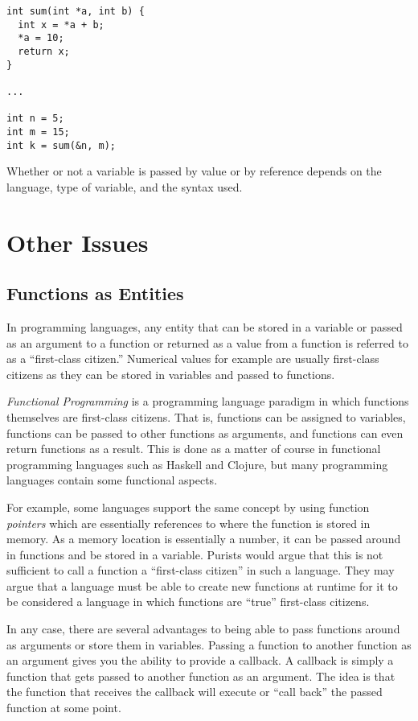 \begin{verbatim}
int sum(int *a, int b) {
  int x = *a + b;
  *a = 10;
  return x;
}

...

int n = 5;
int m = 15;
int k = sum(&n, m);
\end{verbatim}



Whether or not a variable is passed by value or by reference depends
on the language, type of variable, and the syntax used.  

\section{Other Issues}

\subsection{Functions as Entities}

In programming languages, any entity that can be stored in a variable or
passed as an argument to a function or returned as a value from a function
is referred to as a ``first-class citizen.''  
Numerical values for example are
usually first-class  citizens as they can be stored in variables and passed 
to functions.

\emph{Functional Programming} 
is a programming language paradigm in
which functions themselves are first-class citizens.  That is, functions can
be assigned to variables, functions can be passed to other functions as 
arguments, and functions can even return functions as a result.  This is
done as a matter of course in functional programming languages such as
Haskell and Clojure, but many programming languages contain some 
functional aspects.

For example, some languages support the same concept by using function 
\emph{pointers} which are essentially references to where the function is stored in memory.
As a memory location is essentially a number, it can be passed around in
functions and be stored in a variable.  Purists would argue that this is
not sufficient to call a function a ``first-class citizen'' in such a language.
They may argue that a language must be able to create new functions
at runtime for it to be considered a language in which functions are 
``true'' first-class citizens.

In any case, there are several advantages to being able to pass functions
around as arguments or store them in variables.  Passing a function
to another function as an argument gives you the ability to provide a
\gls{callback}.  A  callback is simply a function that gets passed to another
function as an argument.  The idea is that the function that receives
the callback will execute or ``call back'' the passed function at some
point.

